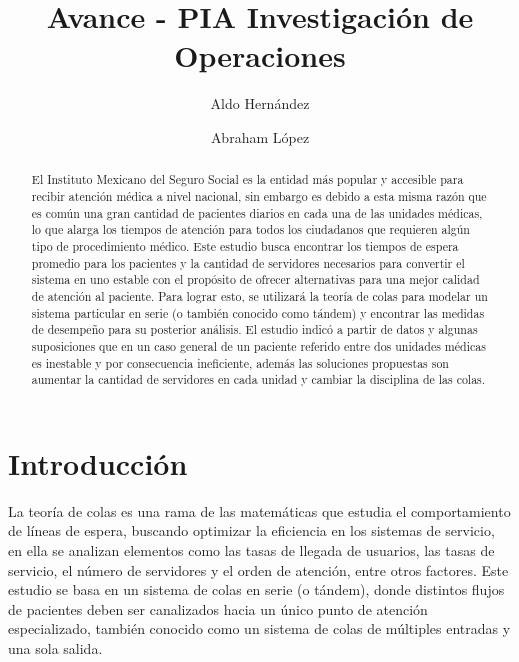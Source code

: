 \documentclass[10pt]{article}
\begin{document}
	\begin{opening}
		\title{Avance - PIA Investigación de Operaciones}
		\author[Universidad Autónoma de Nuevo León, San Nicolás de los Garza, aldo.hernandezt@uanl.edu.mx]{Aldo Hernández}
		\author[Universidad Autónoma de Nuevo León, San Nicolás de los Garza, abraham.lopezg@uanl.edu.mx]{Abraham López}
		
		\begin{abstract}
            El Instituto Mexicano del Seguro Social es la entidad más popular y accesible para recibir atención médica a nivel nacional, sin embargo es debido a esta misma razón que es común una gran cantidad de pacientes diarios en cada una de las unidades médicas, lo que alarga los tiempos de atención para todos los ciudadanos que requieren algún tipo de procedimiento médico. Este estudio busca encontrar los tiempos de espera promedio para los pacientes y la cantidad de servidores necesarios para convertir el sistema en uno estable con el propósito de ofrecer alternativas para una mejor calidad de atención al paciente. Para lograr esto, se utilizará la teoría de colas para modelar un sistema particular en serie (o también conocido como tándem) y encontrar las medidas de desempeño para su posterior análisis. El estudio indicó a partir de datos y algunas suposiciones que en un caso general de un paciente referido entre dos unidades médicas es inestable y por consecuencia ineficiente, además las soluciones propuestas son aumentar la cantidad de servidores en cada unidad y cambiar la disciplina de las colas.
		\end{abstract}

	\end{opening}
	
	\section{Introducción}
	La teoría de colas es una rama de las matemáticas que estudia el comportamiento de líneas de espera, buscando optimizar la eficiencia en los sistemas de servicio, en ella se analizan elementos como las tasas de llegada de usuarios, las tasas de servicio, el número de servidores y el orden de atención, entre otros factores. Este estudio se basa en un sistema de colas en serie (o tándem), donde distintos flujos de pacientes deben ser canalizados hacia un único punto de atención especializado, también conocido como un sistema de colas de múltiples entradas y una sola salida.
	
\end{document}
